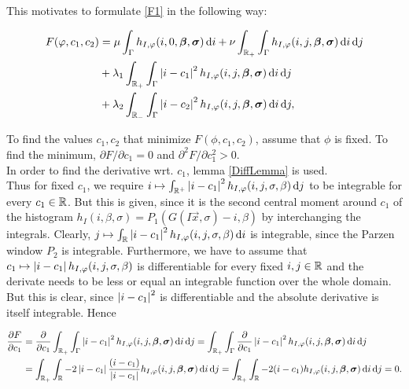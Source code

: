 This motivates to formulate \eqref{F1} in the following way:

\begin{equation}
  \begin{split}
    F(\phi,c_1,c_2) &= \mu \int_{\Gamma}h_{I,\phi}(i,0,\vec{\beta},\vec{\sigma})\df i + \nu\int_{\R_+}\int_{\Gamma}h_{I,\phi}(i,j,\vec{\beta},\vec{\sigma})\df i \df j\\
    &+ \lambda_1\int_{\R_+} \int_{\Gamma} \abs{i-c_1}^2h_{I,\phi}(i,j,\vec{\beta},\vec{\sigma})\df i\df j\\
    &+ \lambda_2\int_{\R_-} \int_{\Gamma} \abs{i-c_2}^2h_{I,\phi}(i,j,\vec{\beta},\vec{\sigma})\df i\df j,
  \end{split}\label{LOLF}
\end{equation}

To find the values $c_1,c_2$ that minimize $F(\phi,c_1,c_2)$, assume that $\phi$ is fixed. To find the minimum, $\partial F/\partial c_1 =0$ and $\partial^2 F/\partial c_1^2 > 0$. \\

In order to find the derivative wrt. $c_1$, lemma \ref{DiffLemma} is used.\\
Thus for fixed $c_1$, we require $i\mapsto \int_{\mathbb R^+}\left| {i-c_1} \right|^2h_{I,\varphi}(i,j,\sigma,\beta)\,{\rm d} j$ to be integrable for every $c_1\in\mathbb R$. But this is given, since it is the second central moment around $c_1$ of the histogram $h_I(i,\beta,\sigma) = P_1(G(I\vec{x},\sigma)-i,\beta)$ by interchanging the integrals. Clearly, $j\mapsto \int_\mathbb R\left| {i-c_1} \right|^2h_{I,\varphi}(i,j,\sigma,\beta)\,{\rm d} i$ is integrable, since the Parzen window $P_2$ is integrable. Furthermore, we have to assume that  $c_1 \mapsto \left| {i-c_1} \right|h_{I,\varphi}(i,j,\sigma,\beta)$ is differentiable for every fixed $i,j\in \mathbb R$ and the derivate needs to be less or equal an integrable function over the whole domain. But this is clear, since $\left| {i-c_1} \right|^2$ is differentiable and the absolute derivative is itself integrable. Hence

\begin{equation}
\begin{split}
  \frac{\partial F}{\partial c_1} &= \frac{\partial }{\partial c_1} \int_{\mathbb R_+}\int_{\Gamma}\left| {i-c_1} \right|^2 h_{I,\varphi}(i,j,\boldsymbol{\beta} ,\boldsymbol{\sigma} ) \,{\rm d} i\,{\rm d} j 
  = \int_{\mathbb R_+}\int_{\Gamma}\frac{\partial }{\partial c_1}\left| {i-c_1} \right|^2 h_{I,\varphi}(i,j,\boldsymbol{\beta} ,\boldsymbol{\sigma} ) \,{\rm d} i\,{\rm d} j \\
  &= \int_{\mathbb R_+} \int_\mathbb R-2\left| {i-c_1} \right|\frac{(i-c_1)}{\left| {i-c_1} \right|} h_{I,\varphi}(i,j,\boldsymbol{\beta} ,\boldsymbol{\sigma} ) \,{\rm d} i\,{\rm d} j 
  = \int_{\mathbb R_+} \int_\mathbb R-2(i-c_1) h_{I,\varphi}(i,j,\boldsymbol{\beta} ,\boldsymbol{\sigma} ) \,{\rm d} i\,{\rm d} j = 0.
\end{split}
\end{equation}


